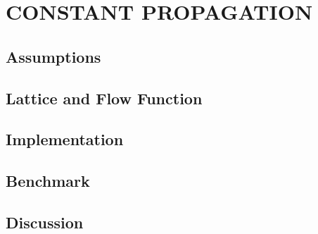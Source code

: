 \section{CONSTANT PROPAGATION}

\subsection{Assumptions}

\subsection{Lattice and Flow Function}

\subsection{Implementation}

\subsection{Benchmark}

\subsection{Discussion}